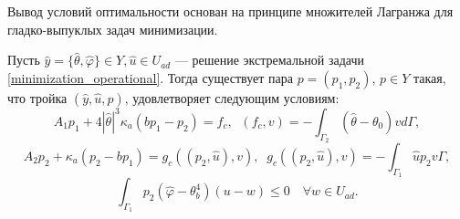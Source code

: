 \documentclass[10pt]{article}
\begin{document}
    Вывод условий оптимальности основан на принципе множителей Лагранжа для гладко-выпуклых задач минимизации.
    \begin{thm}
        \label{adjoint_theorem}
        Пусть $\hat{y}=\{\hat{\theta},\hat{\varphi} \} \in Y, \hat{u} \in U_{ad}$ --- решение экстремальной задачи \eqref{minimization_operational}. Тогда существует пара $p = (p_1, p_2)$, $p \in Y$
        такая, что тройка $(\hat{y}, \hat{u}, p)$, удовлетворяет следующим условиям:
        \begin{equation}
            \label{therorem_2_eq1}
            A_1 p_1 + 4 |\hat{\theta}|^3 \kappa_a(b p_1 - p_2) = f_c, \;\; (f_c,v) = - \int_{\Gamma_2} (\hat{\theta} - \theta_0) v d\Gamma,
        \end{equation}
        \begin{equation}
            \label{therorem_2_eq2}
            A_2 p_2 + \kappa_a (p_2-b p_1) = g_c(( p_2, \hat{u}),v), \;\; g_c(( p_2, \hat{u}),v) = -\int_{\Gamma_1} \hat{u} p_2 v\Gamma,
        \end{equation}
        \begin{equation}
            \label{therorem_2_eq3}
            \int_{\Gamma_1} p_2 (\hat{\varphi} - \theta_b^4)(u-w) \leq 0 \quad \forall w \in U_{ad}.
        \end{equation}
    \end{thm}
\end{document}
